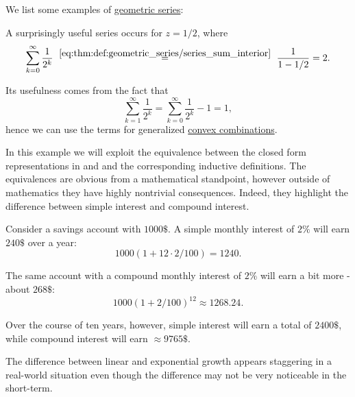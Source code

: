 \begin{example}\label{ex:def:geometric_series}
  We list some examples of \hyperref[def:geometric_series]{geometric series}:
  \begin{thmenum}
     A surprisingly useful series occurs for \( z = 1 / 2 \), where
    \begin{equation}\label{eq:ex:def:geometric_series/two}
      \sum_{k=0}^\infty \frac 1 {2^k}
      \reloset {\eqref{eq:thm:def:geometric_series/series_sum_interior}} =
      \frac 1 {1 - 1 / 2}
      =
      2.
    \end{equation}

    Its usefulness comes from the fact that
    \begin{equation}\label{eq:ex:def:geometric_series/two/one}
      \sum_{k=1}^\infty \frac 1 {2^k}
      =
      \sum_{k=0}^\infty \frac 1 {2^k} - 1
      =
      1,
    \end{equation}
    hence we can use the terms for generalized \hyperref[def:convex_hull]{convex combinations}.

     In this example we will exploit the equivalence between the closed form representations in  and  and the corresponding inductive definitions. The equivalences are obvious from a mathematical standpoint, however outside of mathematics they have highly nontrivial consequences. Indeed, they highlight the difference between simple interest and compound interest.

    Consider a savings account with \( 1000\$ \). A simple monthly interest of \( 2\% \) will earn \( 240\$ \) over a year:
    \begin{equation*}
      1000 (1 + 12 \cdot 2 / 100) = 1240.
    \end{equation*}

    The same account with a compound monthly interest of \( 2\% \) will earn a bit more - about \( 268\$ \):
    \begin{equation*}
      1000 (1 + 2 / 100)^{12} \approx 1268.24.
    \end{equation*}

    Over the course of ten years, however, simple interest will earn a total of \( 2400\$ \), while compound interest will earn \( \approx 9765\$ \).

    The difference between linear and exponential growth appears staggering in a real-world situation even though the difference may not be very noticeable in the short-term.
  \end{thmenum}
\end{example}

